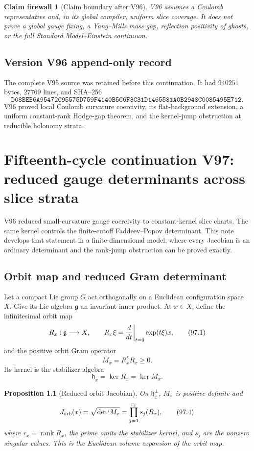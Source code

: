 \documentclass[11pt]{article}
\newtheorem{proposition}[theorem]{Proposition}
\newtheorem{firewall}[theorem]{Claim firewall}
\theoremstyle{remark}
\begin{document}
\begin{firewall}[Claim boundary after V96]
\label{fire:v15v96}
V96 assumes a Coulomb representative and, in its global compiler,
uniform slice coverage.  It does not prove a global gauge fixing,
a Yang--Mills mass gap, reflection positivity of ghosts, or the
full Standard Model--Einstein continuum.
\end{firewall}

\section*{Version V96 append-only record}
The complete V95 source was retained before this continuation.  It
had \(940251\) bytes, \(27769\) lines, and SHA--256
\[
 \texttt{D08BEB6A95472C95575D759F4140B5C6F3C31D1465581A0B2948C0085495E712}.
\]
V96 proved local Coulomb curvature coercivity, its flat-background
extension, a uniform constant-rank Hodge-gap theorem, and the
kernel-jump obstruction at reducible holonomy strata.
\chapter{Fifteenth-cycle continuation V97: reduced gauge determinants across slice strata}
\label{sec:v15v97}

V96 reduced small-curvature gauge coercivity to constant-kernel
slice charts.  The same kernel controls the finite-cutoff
Faddeev--Popov determinant.  This note develops that statement in a
finite-dimensional model, where every Jacobian is an ordinary
determinant and the rank-jump obstruction can be proved exactly.

\section{Orbit map and reduced Gram determinant}

Let a compact Lie group \(G\) act orthogonally on a Euclidean
configuration space \(X\).  Give its Lie algebra \(\mathfrak g\) an
invariant inner product.  At \(x\in X\), define the infinitesimal
orbit map
\[
 R_x:\mathfrak g\longrightarrow X,\qquad
 R_x\xi={d\over dt}\bigg|_{t=0}\exp(t\xi)x,            \tag{97.1}
\]
and the positive orbit Gram operator
\[
 M_x=R_x^*R_x\geq0.                                   \tag{97.2}
\]
Its kernel is the stabilizer algebra
\[
 \mathfrak h_x=\ker R_x=\ker M_x.                     \tag{97.3}
\]

\begin{proposition}[Reduced orbit Jacobian]
\label{prop:v15v97-orbit}
On \(\mathfrak h_x^\perp\), \(M_x\) is positive definite and
\[
 J_{\rm orb}(x)
 =\sqrt{\det{}'M_x}
 =\prod_{j=1}^{r_x}s_j(R_x),                           \tag{97.4}
\]
where \(r_x=\operatorname{rank}R_x\), the prime omits the stabilizer
kernel, and \(s_j\) are the nonzero singular values.  This is the
Euclidean volume expansion of the orbit map.
\end{proposition}
\end{document}
